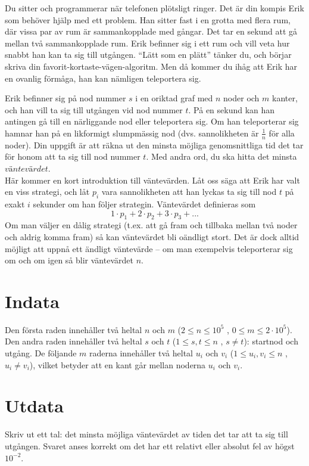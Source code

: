 Du sitter och programmerar när telefonen plötsligt ringer. Det är din kompis Erik som behöver hjälp med ett problem.
Han sitter fast i en grotta med flera rum, där vissa par av rum är sammankopplade med gångar.
Det tar en sekund att gå mellan två sammankopplade rum. Erik befinner sig i ett rum och vill veta
hur snabbt han kan ta sig till utgången. ``Lätt som en plätt'' tänker du, och börjar skriva 
din favorit-kortaste-vägen-algoritm. Men då kommer du ihåg att Erik har en ovanlig förmåga, han kan nämligen teleportera sig.

Erik befinner sig på nod nummer $s$ i en oriktad graf med $n$ noder och $m$ kanter, och han vill ta sig till utgången vid nod nummer $t$. På en sekund kan han antingen gå till
en närliggande nod eller teleportera sig. Om han teleporterar sig hamnar han på en likformigt slumpmässig nod (dvs. sannolikheten är $\frac{1}{n}$ för alla noder).
Din uppgift är att räkna ut den minsta möjliga genomsnittliga tid det tar för honom att ta sig till nod nummer $t$. Med andra ord, du ska hitta det minsta $\textit{väntevärdet}$.\\

Här kommer en kort introduktion till väntevärden. Låt oss säga att Erik har valt en viss strategi, och låt $p_i$ vara sannolikheten att han lyckas
ta sig till nod $t$ på exakt $i$ sekunder om han följer strategin. Väntevärdet definieras som
$$1\cdot p_1 + 2\cdot p_2 + 3\cdot p_3 + ...$$
Om man väljer en dålig strategi (t.ex. att gå fram och tillbaka mellan två noder och aldrig komma fram) så kan väntevärdet bli oändligt stort.
Det är dock alltid möjligt att uppnå ett ändligt väntevärde -- om man exempelvis teleporterar sig om och om igen så blir väntevärdet $n$.

\section*{Indata}
Den första raden innehåller två heltal $n$ och $m$ ($2 \leq n \leq 10^5$ , $0 \leq m \leq 2\cdot 10^5$).
Den andra raden innehåller två heltal $s$ och $t$ ($1 \leq s,t \leq n$ , $s \neq t$): startnod och utgång.
De följande $m$ raderna innehåller två heltal $u_i$ och $v_i$ ($1 \leq u_i , v_i \leq n$ , $u_i \neq v_i$), 
vilket betyder att en kant går mellan noderna $u_i$ och $v_i$.

\section*{Utdata}
Skriv ut ett tal: det minsta möjliga väntevärdet av tiden det tar att ta sig till utgången.
Svaret anses korrekt om det har ett relativt eller absolut fel av högst $10^{-2}$.

